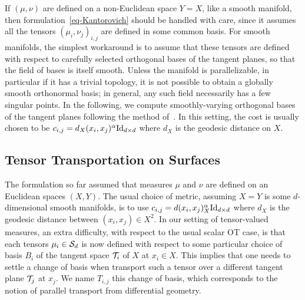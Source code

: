 \begin{rem}
	If $(\mu,\nu)$ are defined on a non-Euclidean space $Y=X$, like a smooth manifold, then formulation~\eqref{eq-Kantorovich} should be handled with care, since it assumes all the tensors $(\mu_i,\nu_j)_{i,j}$ are defined %
	in some common basis. 
	For smooth manifolds, the simplest workaround is to assume that these tensors are defined with respect to carefully selected orthogonal bases of the tangent planes, so that the field of bases is itself smooth. Unless the manifold is parallelizable, in particular if it has a trivial topology, it is not possible to obtain a globally smooth orthonormal basis; in general, any such field necessarily has a few singular points. In the following, we compute smoothly-varying orthogonal bases of the tangent planes following the method of~\cite{crane2010trivial}. 
	In this setting, the cost is usually chosen to be $c_{i,j} = d_X(x_i,x_j)^\alpha \mathrm{Id}_{d \times d}$ where $d_X$ is the geodesic distance on $X$. 
\end{rem}

\subsection{Tensor Transportation on Surfaces}



The formulation so far assumed that measures $\mu$ and $\nu$ are defined on an Euclidean spaces $(X,Y)$. The usual choice of metric, assuming $X=Y$ is some $d$-dimensional smooth manifolds, is to use $c_{i,j} = d(x_i,x_j)_X^\alpha \mathrm{Id}_{d \times d}$ where $d_X$ is the geodesic distance between $(x_i,x_j) \in X^2$. 
%
In our setting of tensor-valued measures, an extra difficulty, with respect to the usual scalar OT case, is that each tensors $\mu_i \in \mathcal{S}_d$ is now defined with respect to some particular choice of basis $B_i$ of the tangent space $\mathcal{T}_i$ of $X$ at $x_i \in X$. 
% 
This implies that one needs to settle a change of basis when transport such a tensor over a different tangent plane $\mathcal{T}_j$ at $x_j$. We name $T_{i,j}$ this change of basis, which corresponds to the notion of parallel transport from differential geometry.

